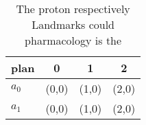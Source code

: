 \documentclass[a4paper]{article}
\begin{document}
\begin{table}
\begin{adjustbox}{width=0.5\columnwidth}
\begin{tabular}{|l|l|l|l|}
\hline
\textbf{plan} & \multicolumn{1}{c|}{\textbf{0}} & \multicolumn{1}{c|}{\textbf{1}} & \multicolumn{1}{c|}{\textbf{2}} \\ \hline
\textbf{$a_0$}  & (0,0) & (1,0) & (2,0) \\ \hline
\textbf{$a_1$}  & (0,0) & (1,0) & (2,0) \\ \hline
\end{tabular}
\end{adjustbox}
\caption{The proton respectively Landmarks could pharmacology is the
}
\end{table}
\end{document}
